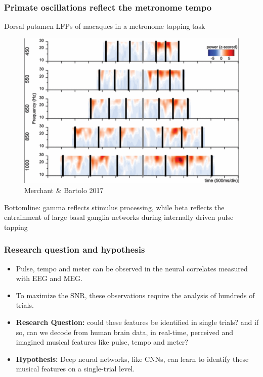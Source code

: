 \documentclass{beamer}
\begin{document}
\begin{frame}
	\frametitle{Primate oscillations reflect the metronome tempo}

	Dorsal putamen LFPs of macaques in a metronome tapping task	

	\begin{figure}
		\centering
			\item 
		\includegraphics[scale=0.18]{fig6.png}
		\caption{Merchant \& Bartolo 2017}
	\end{figure}

	Bottomline: gamma reflects stimulus processing, while beta reflects the entrainment of large basal ganglia networks during internally driven pulse tapping

\end{frame}

\begin{frame}
	\frametitle{Research question and hypothesis}
	
	\begin{itemize}

		\item Pulse, tempo and meter can be observed in the neural correlates measured with EEG and MEG.

		\item To maximize the SNR, these observations require the analysis of hundreds of trials.

		\item \textbf{Research Question:} could these features be identified in single trials? and if so, can we decode from human brain data, in real-time, perceived and imagined musical features like pulse, tempo and meter? 
			 
		\item \textbf{Hypothesis:} Deep neural networks, like CNNs, can learn to identify these musical features on a single-trial level.

	\end{itemize}

\end{frame}
\end{document}
